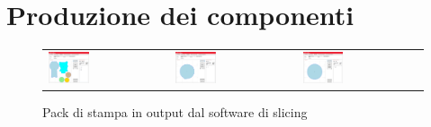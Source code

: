 \documentclass[%
corpo=11pt,
twoside,
 stile=classica,
oldstyle,
greek,%
]{toptesi}
\begin{document}
	\section{Produzione dei componenti}
		\begin{figure}
		\centering
		\begin{tabular}{lll}
		\includegraphics[width=0.35\textwidth]{Screen/pack1.png}
		&
		\includegraphics[width=0.35\textwidth]{Screen/pack2.png}
		&
		\includegraphics[width=0.35\textwidth]{Screen/pack3.png}
		\end{tabular}
		\caption{Pack di stampa in output dal software di slicing }
		\label{fig:pack}
		\end{figure} 
\end{document}

